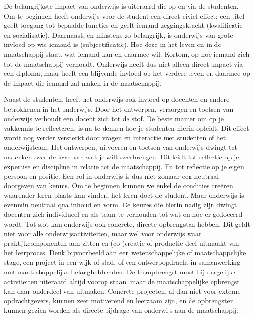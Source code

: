 \documentclass[empirical, authordate, ]{new-jote-article}
\begin{document}
	De belangrijkste impact van onderwijs is uiteraard die op en via de studenten. Om te beginnen heeft onderwijs voor de student een direct civiel effect: een titel geeft toegang tot bepaalde functies en geeft iemand zeggingskracht (kwalificatie en socialisatie). Daarnaast, en minstens zo belangrijk, is onderwijs van grote invloed op wie iemand is (subjectificatie). Hoe deze in het leven en in de maatschappij staat, wat iemand kan en daarmee wil. Kortom, op hoe iemand zich tot de maatschappij verhoudt. Onderwijs heeft dus niet alleen direct impact via een diploma, maar heeft een blijvende invloed op het verdere leven en daarmee op de impact die iemand zal maken in de maatschappij.



	Naast de studenten, heeft het onderwijs ook invloed op docenten en andere betrokkenen in het onderwijs. Door het ontwerpen, verzorgen en toetsen van onderwijs verhoudt een docent zich tot de stof. De beste manier om op je vakkennis te reflecteren, is na te denken hoe je studenten hierin opleidt. Dit effect wordt nog verder versterkt door vragen en interactie met studenten of het onderwijsteam. Het ontwerpen, uitvoeren en toetsen van onderwijs dwingt tot nadenken over de kern van wat je wilt overbrengen. Dit leidt tot reflectie op je expertise en discipline in relatie tot de maatschappij. En tot reflectie op je eigen persoon en positie. Een rol in onderwijs is dus niet zomaar een neutraal doorgeven van kennis. Om te beginnen kunnen we enkel de condities creëren waaronder leren plaats kan vinden, het leren doet de student. Maar onderwijs is evenmin neutraal qua inhoud en vorm. De keuzes die hierin nodig zijn dwingt docenten zich individueel en als team te verhouden tot wat en hoe er gedoceerd wordt. Tot slot kan onderwijs ook concrete, directe opbrengsten hebben. Dit geldt niet voor alle onderwijsactiviteiten, maar wel voor onderwijs waar praktijkcomponenten aan zitten en (co-)creatie of productie deel uitmaakt van het leerproces. Denk bijvoorbeeld aan een wetenschappelijke of maatschappelijke stage, een project in een wijk of stad, of een ontwerpopdracht in samenwerking met maatschappelijke belanghebbenden. De leeropbrengst moet bij dergelijke activiteiten uiteraard altijd voorop staan, maar de maatschappelijke opbrengst kan daar onderdeel van uitmaken. Concrete projecten, al dan niet voor externe opdrachtgevers, kunnen zeer motiverend en leerzaam zijn, en de opbrengsten kunnen gezien worden als directe bijdrage van onderwijs aan de maatschappij.
\end{document}
